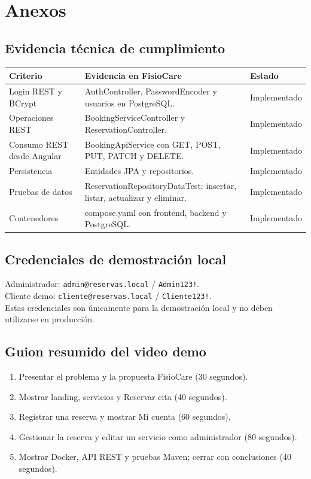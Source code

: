 \documentclass[12pt,a4paper,oneside]{report}
\begin{document}
\appendix
\chapter{Anexos}
\section{Evidencia técnica de cumplimiento}
\begin{tabularx}{\textwidth}{|>{\raggedright\arraybackslash}p{3.8cm}|Y|>{\centering\arraybackslash}p{3.0cm}|}
\hline
{}\color{white}\textbf{Criterio} & \color{white}\textbf{Evidencia en FisioCare} & \color{white}\textbf{Estado}\\
\hline
Login REST y BCrypt & AuthController, PasswordEncoder y usuarios en PostgreSQL. & Implementado\\
\hline
Operaciones REST & BookingServiceController y ReservationController. & Implementado\\
\hline
Consumo REST desde Angular & BookingApiService con GET, POST, PUT, PATCH y DELETE. & Implementado\\
\hline
Persistencia & Entidades JPA y repositorios. & Implementado\\
\hline
Pruebas de datos & ReservationRepositoryDataTest: insertar, listar, actualizar y eliminar. & Implementado\\
\hline
Contenedores & compose.yaml con frontend, backend y PostgreSQL. & Implementado\\
\hline
\end{tabularx}

\section{Credenciales de demostración local}
Administrador: \texttt{admin@reservas.local} / \texttt{Admin123!}.\\
Cliente demo: \texttt{cliente@reservas.local} / \texttt{Cliente123!}.\\
\textcolor{TextGray}{\small Estas credenciales son únicamente para la demostración local y no deben utilizarse en producción.}

\section{Guion resumido del video demo}
{\small
\begin{enumerate}[itemsep=1pt,topsep=2pt]
\item Presentar el problema y la propuesta FisioCare (30 segundos).
\item Mostrar landing, servicios y Reservar cita (40 segundos).
\item Registrar una reserva y mostrar Mi cuenta (60 segundos).
\item Gestionar la reserva y editar un servicio como administrador (80 segundos).
\item Mostrar Docker, API REST y pruebas Maven; cerrar con conclusiones (40 segundos).
\end{enumerate}
}
\end{document}
